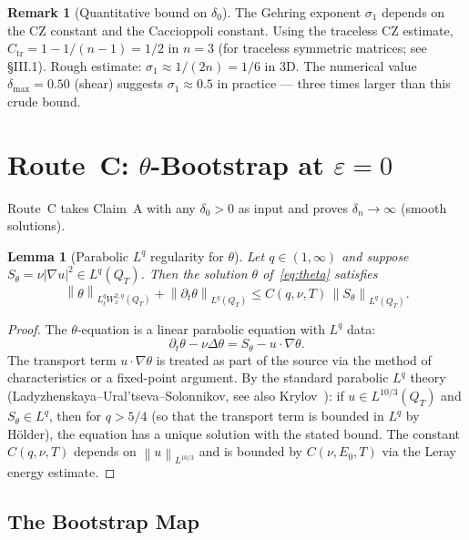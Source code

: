 \documentclass[11pt]{article}
\newtheorem{lemma}[theorem]{Lemma}
\theoremstyle{definition}
\newtheorem{remark}[theorem]{Remark}
\theoremstyle{remark}
\newcommand{\norm}[1]{\left\|#1\right\|}
\newcommand{\grad}{\nabla}
\begin{document}
\begin{remark}[Quantitative bound on $\delta_0$]
  The Gehring exponent $\sigma_1$ depends on the CZ constant
  and the Caccioppoli constant.  Using the traceless CZ estimate,
  $C_{\operatorname{tr}} = 1 - 1/(n-1) = 1/2$ in $n=3$ (for traceless
  symmetric matrices; see \cite{Stein1970} §III.1).
  Rough estimate: $\sigma_1 \approx 1/(2n) = 1/6$ in 3D.
  The numerical value $\delta_{\max}=0.50$ (shear) suggests $\sigma_1 \approx 0.5$
  in practice — three times larger than this crude bound.
\end{remark}

\section{Route~C: $\theta$-Bootstrap at $\varepsilon = 0$}
\label{sec:routeC}

Route~C takes Claim~A with any $\delta_0 > 0$ as input and proves
$\delta_n \to \infty$ (smooth solutions).

\begin{lemma}[Parabolic $L^q$ regularity for $\theta$]\label{lem:parabolic}
  Let $q\in(1,\infty)$ and suppose $S_\theta = \nu|\grad u|^2\in L^q(Q_T)$.
  Then the solution $\theta$ of~\eqref{eq:theta} satisfies
  \[
    \norm{\theta}_{L^q_t W^{2,q}_x(Q_T)}
    + \norm{\partial_t\theta}_{L^q(Q_T)}
    \leq C(q,\nu,T)\,\norm{S_\theta}_{L^q(Q_T)}.
  \]
\end{lemma}

\begin{proof}
  The $\theta$-equation is a linear parabolic equation with $L^q$ data:
  \[
    \partial_t\theta - \nu\Delta\theta = S_\theta - u\cdot\grad\theta.
  \]
  The transport term $u\cdot\grad\theta$ is treated as part of the source
  via the method of characteristics or a fixed-point argument.
  By the standard parabolic $L^q$ theory (Ladyzhenskaya--Ural'tseva--Solonnikov,
  see also Krylov~\cite{Krylov1996}):
  if $u\in L^{10/3}(Q_T)$ and $S_\theta\in L^q$, then for $q>5/4$
  (so that the transport term is bounded in $L^q$ by H\"older), the
  equation has a unique solution with the stated bound.
  The constant $C(q,\nu,T)$ depends on $\norm{u}_{L^{10/3}}$ and is
  bounded by $C(\nu,E_0,T)$ via the Leray energy estimate.
\end{proof}

\subsection{The Bootstrap Map}
\end{document}
